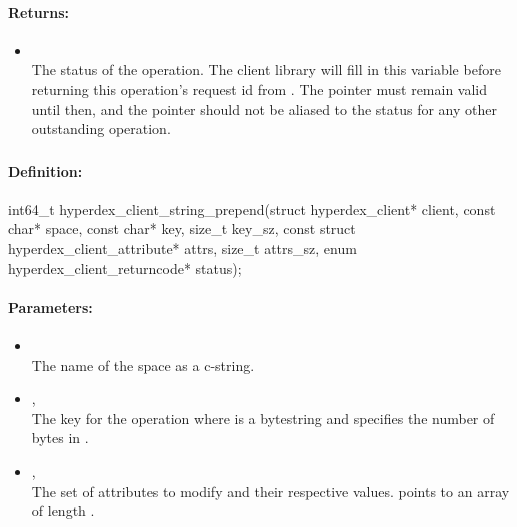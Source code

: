 \paragraph{Returns:}
\begin{itemize}[noitemsep]
\item {}\\
The status of the operation.  The client library will fill in this variable before returning this operation's request id from .  The pointer must remain valid until then, and the pointer should not be aliased to the status for any other outstanding operation.
\end{itemize}

\pagebreak
\subsubsection{}
\label{api:c:string_prepend}


\paragraph{Definition:}
\begin{ccode}
int64_t hyperdex_client_string_prepend(struct hyperdex_client* client,
        const char* space,
        const char* key, size_t key_sz,
        const struct hyperdex_client_attribute* attrs, size_t attrs_sz,
        enum hyperdex_client_returncode* status);
\end{ccode}

\paragraph{Parameters:}
\begin{itemize}[noitemsep]
\item {}\\
The name of the space as a c-string.
\item {}, \\
The key for the operation where  is a bytestring and  specifies the number of bytes in .
\item {}, \\
The set of attributes to modify and their respective values.   points to an array of length .
\end{itemize}

